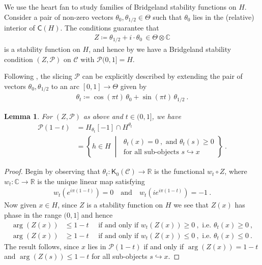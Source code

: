 \documentclass[reqno,a4paper]{amsart}
\newcommand{\calP}{\mathcal{P}}
\newcommand{\C}{\mathbb{C}}
\newcommand{\R}{\mathbb{R}}
\newcommand{\scrC}{\mathscr{C}}
\newcommand{\sfC}{\mathsf{C}}
\newcommand{\sfK}{\mathsf{K}}
\newcommand{\half}{1/2}
\theoremstyle{basic-theorem}
\newtheorem{lemma}[theorem]{Lemma}
\numberwithin{equation}{section}
\begin{document}
We use the heart fan to study families of Bridgeland stability functions on $H$. Consider a pair of non-zero vectors $\theta_0,\theta_{\half}\in \Theta$ such that $\theta_0$ lies in the (relative) interior of $\sfC(H)$. The conditions guarantee that
\begin{align}
	Z\coloneqq \theta_{\half} + i\cdot \theta_0 \, \in \Theta\otimes\C
\end{align}
is a stability function on $H$, and hence by \cite[Proposition~5.3]{B07} we have a Bridgeland stability condition $(Z,\calP)$ on $\scrC$ with $\calP(0,1]=H$.

Following \cite[\S6.2]{HeartFan}, the slicing $\calP$ can be explicitly described by extending the pair of vectors $\theta_0,\theta_{\half}$ to an arc $[0,1]\to \Theta$ given by
\begin{align}\label{eq:thetatarc}
    \theta_t \coloneqq \cos(\pi t)\,\theta_0 + \sin(\pi t)\,\theta_{\half}\ .
\end{align}

\begin{lemma}
    For $(Z,\calP)$ as above and $t\in (0,1]$, we have
    \begin{align}
        \calP(1-t)
        &= H_{\theta_t}[-1]\cap H^{\theta_t}\\
        &= \left\{
            h\in H \;\middle\vert\;
            \begin{array}{l}
                \theta_t(x)=0\ ,\text{ and }\theta_t(s)\geq 0\\[2pt]
                \text{for all sub-objects }s\hookrightarrow x
            \end{array}
        \right\}\ .
    \end{align}
\end{lemma}

\begin{proof}
	Begin by observing that $\theta_t\colon \sfK_0(\scrC)\to \R$ is the functional $w_t\circ Z$, where $w_t\colon \C\to \R$ is the unique linear map satisfying
	\begin{align}
		w_t(e^{i\pi(1-t)})=0\quad\text{and} \quad w_t(ie^{i\pi(1-t)})=-1\ .
	\end{align}
	Now given $x\in H $, since $Z$ is a stability function on $H$ we see that $Z(x)$ has phase in the range $(0,1]$ and hence
	\begin{align}
		\arg(Z(x)) &\leq 1-t \quad \text{ if and only if }
		w_t\left(Z(x)\right)\geq 0\ , \text{ i.e. } \theta_t(x)\geq 0\ ,
		\\
		\arg(Z(x)) &\geq 1-t \quad \text{ if and only if }
		w_t\left(Z(x)\right)\leq 0\ , \text{ i.e. } \theta_t(x)\leq 0\ .
	\end{align}
	The result follows, since $x$ lies in $\calP(1-t)$ if and only if $\arg(Z(x))=1-t$ and $\arg(Z(s))\leq 1-t$ for all sub-objects $s\hookrightarrow x$.
\end{proof}
\end{document}
